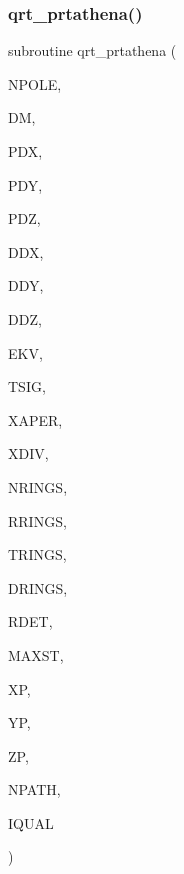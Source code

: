 \subsubsection{\texorpdfstring{qrt\+\_\+prtathena()}{qrt\_prtathena()}}
{\footnotesize\ttfamily subroutine qrt\+\_\+prtathena (\begin{DoxyParamCaption}\item[{integer}]{N\+P\+O\+LE,  }\item[{double precision, dimension(npole)}]{DM,  }\item[{double precision, dimension(npole)}]{P\+DX,  }\item[{double precision, dimension(npole)}]{P\+DY,  }\item[{double precision, dimension(npole)}]{P\+DZ,  }\item[{double precision, dimension(npole)}]{D\+DX,  }\item[{double precision, dimension(npole)}]{D\+DY,  }\item[{double precision, dimension(npole)}]{D\+DZ,  }\item[{double precision}]{E\+KV,  }\item[{double precision}]{T\+S\+IG,  }\item[{double precision}]{X\+A\+P\+ER,  }\item[{double precision}]{X\+D\+IV,  }\item[{integer}]{N\+R\+I\+N\+GS,  }\item[{double precision, dimension(nrings)}]{R\+R\+I\+N\+GS,  }\item[{double precision}]{T\+R\+I\+N\+GS,  }\item[{double precision}]{D\+R\+I\+N\+GS,  }\item[{double precision}]{R\+D\+ET,  }\item[{integer}]{M\+A\+X\+ST,  }\item[{double precision, dimension(maxst)}]{XP,  }\item[{double precision, dimension(maxst)}]{YP,  }\item[{double precision, dimension(maxst)}]{ZP,  }\item[{integer}]{N\+P\+A\+TH,  }\item[{integer}]{I\+Q\+U\+AL }\end{DoxyParamCaption})}

